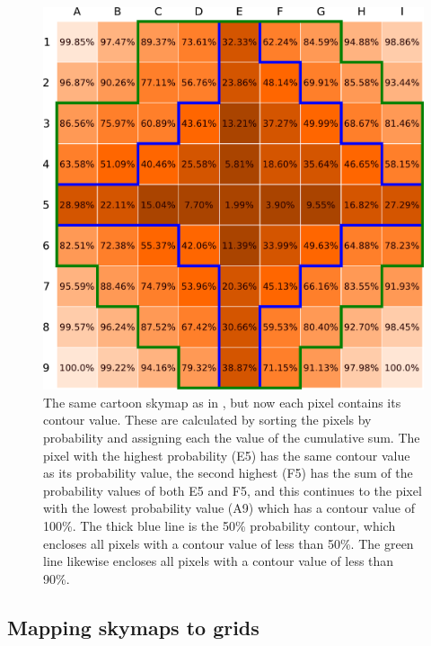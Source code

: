 \begin{colsection}
\begin{colsection}
\begin{figure}[p]
\begin{center}
\includegraphics[width=0.95\linewidth]{images/sim/sim_skymap_conts.pdf}

\end{center}

\caption[An example 2D skymap with pixel contour values]{The same cartoon skymap as in , but now each pixel contains its contour value. These are calculated by sorting the pixels by probability and assigning each the value of the cumulative sum. The pixel with the highest probability (E5) has the same contour value as its probability value, the second highest (F5) has the sum of the probability values of both E5 and F5, and this continues to the pixel with the lowest probability value (A9) which has a contour value of 100\%. The thick blue line is the 50\% probability contour, which encloses all pixels with a contour value of less than 50\%. The green line likewise encloses all pixels with a contour value of less than 90\%.
}
\label{fig:sim_skymap_conts}
\end{figure}


\end{colsection}


\subsection{Mapping skymaps to grids}
\label{sec:mapping_skymaps}
\begin{colsection}


\end{colsection}
\end{colsection}
